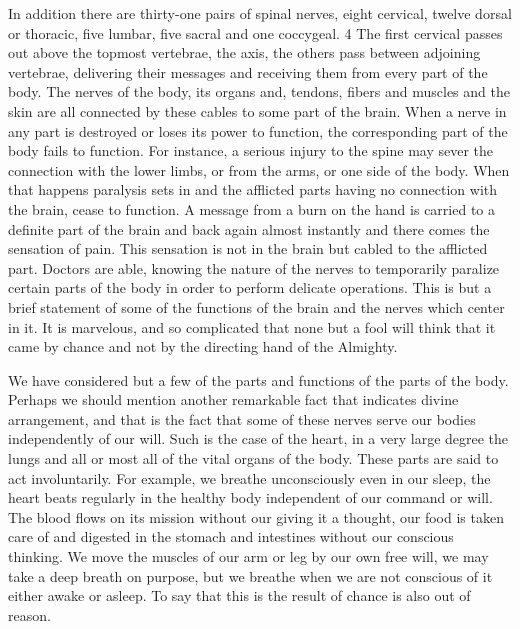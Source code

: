 In addition there are thirty-one pairs of spinal nerves, eight cervical, twelve dorsal or
thoracic, five lumbar, five sacral and one coccygeal. 4 The first cervical passes out above the
topmost vertebrae, the axis, the others pass between adjoining vertebrae, delivering their
messages and receiving them from every part of the body. The nerves of the body, its organs
and, tendons, fibers and muscles and the skin are all connected by these cables to some part
of the brain. When a nerve in any part is destroyed or loses its power to function, the
corresponding part of the body fails to function. For instance, a serious injury to the spine
may sever the connection with the lower limbs, or from the arms, or one side of the body.
When that happens paralysis sets in and the afflicted parts having no connection with the
brain, cease to function. A message from a burn on the hand is carried to a definite part of the
brain and back again almost instantly and there comes the sensation of pain. This sensation is
not in the brain but cabled to the afflicted part. Doctors are able, knowing the nature of the
nerves to temporarily paralize certain parts of the body in order to perform delicate
operations. This is but a brief statement of some of the functions of the brain and the nerves
which center in it. It is marvelous, and so complicated that none but a fool will think that it
came by chance and not by the directing hand of the Almighty.

We have considered but a few of the parts and functions of the parts of the body. Perhaps we
should mention another remarkable fact that indicates divine arrangement, and that is the fact
that some of these nerves serve our bodies independently of our will. Such is the case of the
heart, in a very large degree the lungs and all or most all of the vital organs of the body.
These parts are said to act involuntarily. For example, we breathe unconsciously even in our
sleep, the heart beats regularly in the healthy body independent of our command or will. The
blood flows on its mission without our giving it a thought, our food is taken care of and
digested in the stomach and intestines without our conscious thinking. We move the muscles
of our arm or leg by our own free will, we may take a deep breath on purpose, but we breathe
when we are not conscious of it either awake or asleep. To say that this is the result of chance
is also out of reason.

